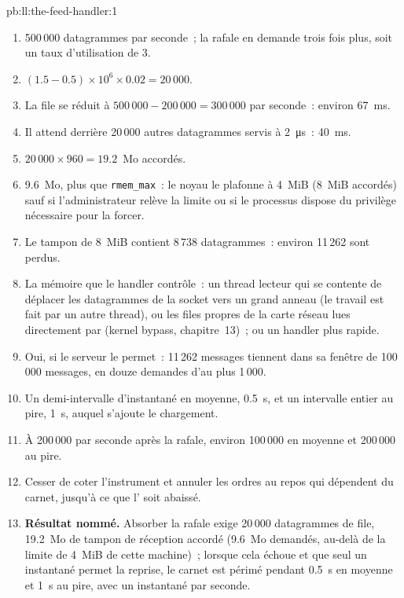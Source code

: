 \begin{solution}{pb:ll:the-feed-handler:1}
\begin{enumerate}
\item 500\,000 datagrammes par seconde~; la rafale en demande trois fois plus, soit un taux d'utilisation de 3.
\item $(1.5 - 0.5) \times 10^6 \times 0.02 = 20\,000$.
\item La file se réduit à $500\,000 - 200\,000 = 300\,000$ par seconde~: environ \qty{67}{\milli\second}.
\item Il attend derrière 20\,000 autres datagrammes servis à \qty{2}{\micro\second}~: \qty{40}{\milli\second}.
\item $20\,000 \times 960 = 19.2$~Mo accordés.
\item 9.6~Mo, plus que \texttt{rmem\_max}~: le noyau le plafonne à 4~MiB (8~MiB accordés) sauf si l'administrateur relève la
limite ou si le processus dispose du privilège nécessaire pour la forcer.
\item Le tampon de 8~MiB contient 8\,738 datagrammes~: environ 11\,262 sont perdus.
\item La mémoire que le handler contrôle~: un thread lecteur qui se contente de déplacer les datagrammes de la socket vers un grand anneau (le travail est
fait par un autre thread), ou les files propres de la carte réseau lues directement par  (kernel bypass, chapitre~13)~; ou un handler plus rapide.
\item Oui, si le serveur le permet~: 11\,262 messages tiennent dans sa fenêtre de 100\,000 messages, en douze demandes d'au plus 1\,000.
\item Un demi-intervalle d'instantané en moyenne, \qty{0.5}{\second}, et un intervalle entier au pire, \qty{1}{\second}, auquel s'ajoute le chargement.
\item À 200\,000 par seconde après la rafale, environ 100\,000 en moyenne et 200\,000 au pire.
\item Cesser de coter l'instrument et annuler les ordres au repos qui dépendent du carnet, jusqu'à ce que l' soit abaissé.
\item \textbf{Résultat nommé.} Absorber la rafale exige 20\,000 datagrammes de file, 19.2~Mo de tampon de réception accordé (9.6~Mo
demandés, au-delà de la limite de 4~MiB de cette machine)~; lorsque cela échoue et que seul un instantané permet la reprise, le carnet est périmé pendant
\qty{0.5}{\second} en moyenne et \qty{1}{\second} au pire, avec un instantané par seconde.

\end{enumerate}
\end{solution}

